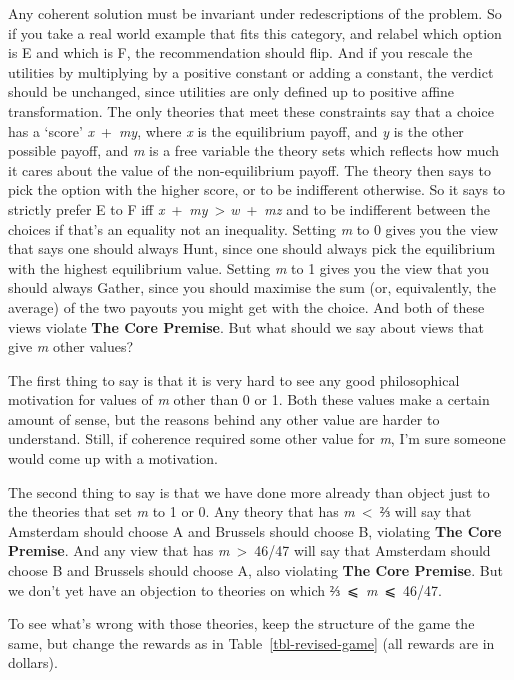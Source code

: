 \documentclass[
  11pt,
  letterpaper,
  DIV=11,
  numbers=noendperiod,
  twoside]{scrartcl}
\begin{document}
Any coherent solution must be invariant under redescriptions of the
problem. So if you take a real world example that fits this category,
and relabel which option is E and which is F, the recommendation should
flip. And if you rescale the utilities by multiplying by a positive
constant or adding a constant, the verdict should be unchanged, since
utilities are only defined up to positive affine transformation. The
only theories that meet these constraints say that a choice has a
`score' \emph{x}~+~\emph{my}, where \emph{x} is the equilibrium payoff,
and \emph{y} is the other possible payoff, and \emph{m} is a free
variable the theory sets which reflects how much it cares about the
value of the non-equilibrium payoff. The theory then says to pick the
option with the higher score, or to be indifferent otherwise. So it says
to strictly prefer E to F iff \emph{x}~+~\emph{my}~\textgreater{}
\emph{w}~+~\emph{mz} and to be indifferent between the choices if that's
an equality not an inequality. Setting \emph{m} to 0 gives you the view
that says one should always Hunt, since one should always pick the
equilibrium with the highest equilibrium value. Setting \emph{m} to 1
gives you the view that you should always Gather, since you should
maximise the sum (or, equivalently, the average) of the two payouts you
might get with the choice. And both of these views violate \textbf{The
Core Premise}. But what should we say about views that give \emph{m}
other values?

The first thing to say is that it is very hard to see any good
philosophical motivation for values of \emph{m} other than 0 or 1. Both
these values make a certain amount of sense, but the reasons behind any
other value are harder to understand. Still, if coherence required some
other value for \emph{m}, I'm sure someone would come up with a
motivation.

The second thing to say is that we have done more already than object
just to the theories that set \emph{m} to 1 or 0. Any theory that has
\emph{m}~\textless~⅔ will say that Amsterdam should choose A and
Brussels should choose B, violating \textbf{The Core Premise}. And any
view that has \emph{m}~\textgreater~46/47 will say that Amsterdam should
choose B and Brussels should choose A, also violating \textbf{The Core
Premise}. But we don't yet have an objection to theories on which
⅔~⩽~\emph{m}~⩽~46/47.

To see what's wrong with those theories, keep the structure of the game
the same, but change the rewards as in Table~\ref{tbl-revised-game} (all
rewards are in dollars).
\end{document}
